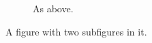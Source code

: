 \begin{figure}[!ht]
  \begin{subfigure}[b]{\textwidth}
%
%
%
%
%

    \caption{As above.}
    \label{fig:example:b}
  \end{subfigure}

  \caption{A figure with two subfigures in it.}
  \label{fig:example}
\end{figure}
